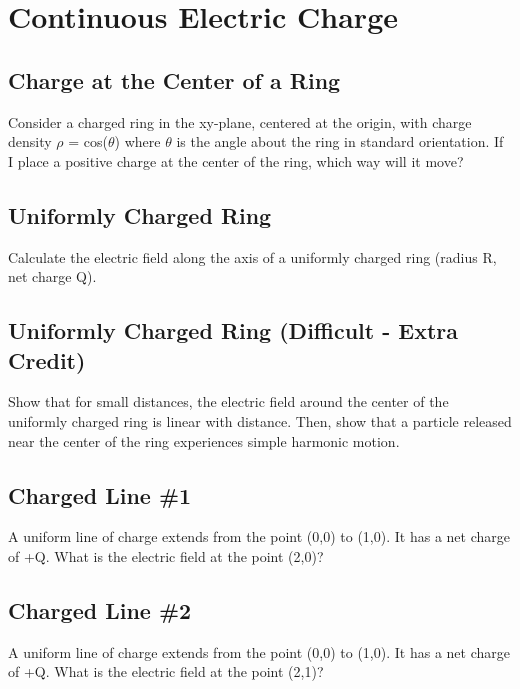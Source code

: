 \documentclass[11pt]{article}
\begin{document}

\pagebreak
\section{Continuous Electric Charge}
\vspace{10pt}

\subsection{Charge at the Center of a Ring}
Consider a charged ring in the xy-plane, centered at the origin, with charge density $\rho$ = cos($\theta$) where $\theta$ is the angle about the ring in standard orientation.  If I place a positive charge at the center of the ring, which way will it move?

\subsection{Uniformly Charged Ring}
Calculate the electric field along the axis of a uniformly charged ring (radius R, net charge Q).

\subsection{Uniformly Charged Ring (Difficult - Extra Credit)}
Show that for small distances, the electric field around the center of the uniformly charged ring is linear with distance.  Then, show that a particle released near the center of the ring experiences simple harmonic motion.

\subsection{Charged Line \#1}
A uniform line of charge extends from the point (0,0) to (1,0).  It has a net charge of +Q.  What is the electric field at the point (2,0)?

\subsection{Charged Line \#2}
A uniform line of charge extends from the point (0,0) to (1,0).  It has a net charge of +Q.  What is the electric field at the point (2,1)?

\end{document}
